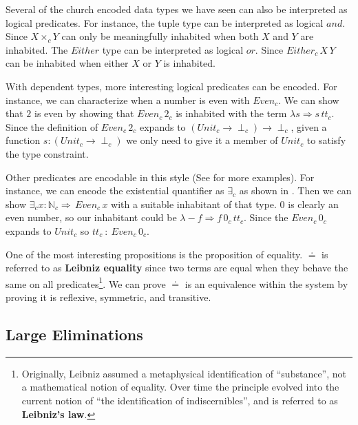 Several of the church encoded data types we have seen can also be interpreted as logical predicates.
For instance, the tuple type can be interpreted as logical $and$.
Since $X\times_{c}Y$ can only be meaningfully inhabited when both $X$ and $Y$ are inhabited.
The $Either$ type can be interpreted as logical $or$.
Since $Either_{c}\,X\,Y$ can be inhabited when either $X$ or $Y$ is inhabited.

With dependent types, more interesting logical predicates can be encoded.
For instance, we can characterize when a number is even with $Even_{c}$.
We can show that $2$ is even by showing that $Even_{c}\,2_{c}$ is inhabited with the term $\lambda s\Rightarrow s\,tt_{c}$.
Since the definition of $Even_{c}\,2_{c}$ expands to $(Unit_{c} \rightarrow \perp_{c}) \rightarrow \perp_{c}$, given a function $s : (Unit_{c} \rightarrow \perp_{c})$ we only need to give it a member of $Unit_{c}$ to satisfy the type constraint.

Other predicates are encodable in this style (See \cite{Martin-Lof-1971,cardelli1986polymorphic,10.1016/0890-5401(88)90005-3} for more examples).
For instance, we can encode the existential quantifier as $\exists_{c}$ as shown in .
Then we can show $\exists_{c}x:\mathbb{N}_{c}\Rightarrow\,Even_{c}\,x$ with a suitable inhabitant of that type.
$0$ is clearly an even number, so our inhabitant could be $\lambda-f\Rightarrow f\,0_{c}\,tt_{c}$.
Since the $Even_{c}\,0_{c}$ expands to $Unit_{c}$ so $tt_{c}\ :\ Even_{c}\,0_{c}$.

One of the most interesting propositions is the proposition of equality.
$\doteq$ is referred to as \textbf{Leibniz equality} since two terms are equal when they behave the same on all predicates\footnote{
  Originally, Leibniz assumed a metaphysical identification of ``substance'', not a mathematical notion of equality\cite[Section 9]{Leibniz1686}.
  Over time the principle evolved into the current notion of ``the identification of indiscernibles'', and is referred to as \textbf{Leibniz's law}.
}. 
We can prove $\doteq$ is an equivalence within the system by proving it is reflexive, symmetric, and transitive.

\subsection{Large Eliminations}

